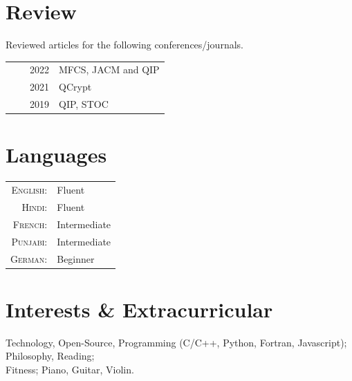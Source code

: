 \documentclass[a4paper,10pt]{article}
\begin{document}
  \section{Review}
  Reviewed articles for the following conferences/journals.\\
  \begin{tabular}{rrp{11cm}}
    & ~~2022 & MFCS, JACM and QIP\\
    & ~~2021 & QCrypt\\
    & ~~2019 & QIP, STOC\\
    \end{tabular}
  


\section{Languages}
\begin{tabular}{rl}
\textsc{English:}&Fluent\\
\textsc{Hindi:}&Fluent\\
\textsc{French:}&Intermediate\\
\textsc{Punjabi:}&Intermediate\\
\textsc{German:}&Beginner\\
\end{tabular}



\section{Interests \& Extracurricular}
Technology, Open-Source, Programming (C/C++, Python, Fortran, Javascript);\\ 
Philosophy, Reading; \\
Fitness; Piano, Guitar, Violin.
\end{document}
